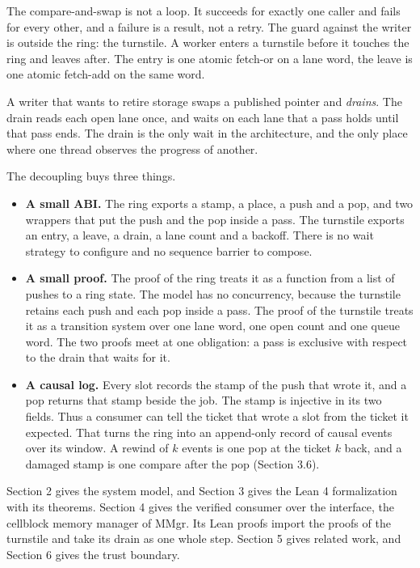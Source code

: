 The compare-and-swap is not a loop. It succeeds for exactly one caller and fails for every other, and a failure is a result, not a retry. The guard against the writer is outside the ring: the turnstile. A worker enters a turnstile before it touches the ring and leaves after. The entry is one atomic fetch-or on a lane word, the leave is one atomic fetch-add on the same word.

A writer that wants to retire storage swaps a published pointer and \emph{drains}. The drain reads each open lane once, and waits on each lane that a pass holds until that pass ends. The drain is the only wait in the architecture, and the only place where one thread observes the progress of another.

The decoupling buys three things.

\begin{itemize}
\item \textbf{A small ABI.} The ring exports a stamp, a place, a push and a pop, and two wrappers that put the push and the pop inside a pass. The turnstile exports an entry, a leave, a drain, a lane count and a backoff. There is no wait strategy to configure and no sequence barrier to compose.
\item \textbf{A small proof.} The proof of the ring treats it as a function from a list of pushes to a ring state. The model has no concurrency, because the turnstile retains each push and each pop inside a pass. The proof of the turnstile treats it as a transition system over one lane word, one open count and one queue word. The two proofs meet at one obligation: a pass is exclusive with respect to the drain that waits for it.
\item \textbf{A causal log.} Every slot records the stamp of the push that wrote it, and a pop returns that stamp beside the job. The stamp is injective in its two fields. Thus a consumer can tell the ticket that wrote a slot from the ticket it expected. That turns the ring into an append-only record of causal events over its window. A rewind of \(k\) events is one pop at the ticket \(k\) back, and a damaged stamp is one compare after the pop (Section 3.6).
\end{itemize}

Section 2 gives the system model, and Section 3 gives the Lean 4 formalization with its theorems. Section 4 gives the verified consumer over the interface, the cellblock memory manager of MMgr. Its Lean proofs import the proofs of the turnstile and take its drain as one whole step. Section 5 gives related work, and Section 6 gives the trust boundary.

